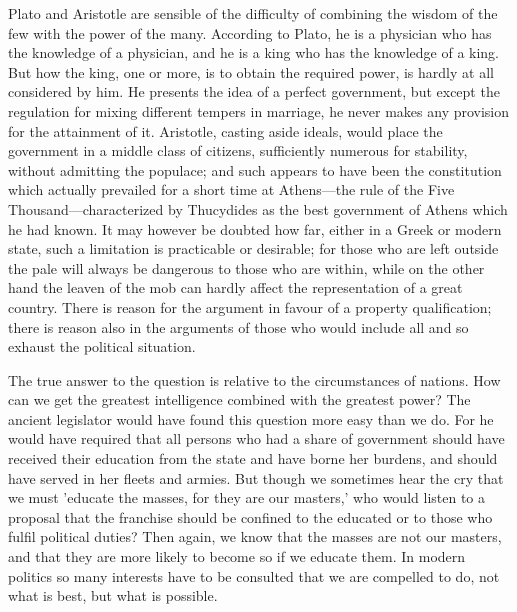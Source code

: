 \documentclass[11pt,letter]{article}
\begin{document}
\par  Plato and Aristotle are sensible of the difficulty of combining the wisdom of the few with the power of the many. According to Plato, he is a physician who has the knowledge of a physician, and he is a king who has the knowledge of a king. But how the king, one or more, is to obtain the required power, is hardly at all considered by him. He presents the idea of a perfect government, but except the regulation for mixing different tempers in marriage, he never makes any provision for the attainment of it. Aristotle, casting aside ideals, would place the government in a middle class of citizens, sufficiently numerous for stability, without admitting the populace; and such appears to have been the constitution which actually prevailed for a short time at Athens—the rule of the Five Thousand—characterized by Thucydides as the best government of Athens which he had known. It may however be doubted how far, either in a Greek or modern state, such a limitation is practicable or desirable; for those who are left outside the pale will always be dangerous to those who are within, while on the other hand the leaven of the mob can hardly affect the representation of a great country. There is reason for the argument in favour of a property qualification; there is reason also in the arguments of those who would include all and so exhaust the political situation.

\par  The true answer to the question is relative to the circumstances of nations. How can we get the greatest intelligence combined with the greatest power? The ancient legislator would have found this question more easy than we do. For he would have required that all persons who had a share of government should have received their education from the state and have borne her burdens, and should have served in her fleets and armies. But though we sometimes hear the cry that we must 'educate the masses, for they are our masters,' who would listen to a proposal that the franchise should be confined to the educated or to those who fulfil political duties? Then again, we know that the masses are not our masters, and that they are more likely to become so if we educate them. In modern politics so many interests have to be consulted that we are compelled to do, not what is best, but what is possible.
\end{document}
